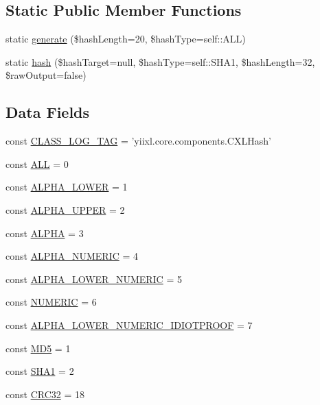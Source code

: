 \subsection*{Static Public Member Functions}
\begin{DoxyCompactItemize}
\item 
static \hyperlink{classCXLHash_a861d68beb0e1d6e79ff85d68212863dd}{generate} (\$hashLength=20, \$hashType=self::ALL)
\item 
static \hyperlink{classCXLHash_ace936368fcb6b1d6d533c4d19cf7e596}{hash} (\$hashTarget=null, \$hashType=self::SHA1, \$hashLength=32, \$rawOutput=false)
\end{DoxyCompactItemize}
\subsection*{Data Fields}
\begin{DoxyCompactItemize}
\item 
const \hyperlink{classCXLHash_aa607ab5e557e6ebb60b85c5a20ad067f}{CLASS\_\-LOG\_\-TAG} = 'yiixl.core.components.CXLHash'
\item 
const \hyperlink{classCXLHash_ab56e734000051e5c12c8c5cf6d8d160d}{ALL} = 0
\item 
const \hyperlink{classCXLHash_a33fc57236d932860ab0ad8e8268e0c99}{ALPHA\_\-LOWER} = 1
\item 
const \hyperlink{classCXLHash_a13afa6f8ce77da9bd4a5af5d473d0d8b}{ALPHA\_\-UPPER} = 2
\item 
const \hyperlink{classCXLHash_a6bb7987358cd3de8e7c775094597e631}{ALPHA} = 3
\item 
const \hyperlink{classCXLHash_a1acce0cfa5c3723599af4c7e325b4312}{ALPHA\_\-NUMERIC} = 4
\item 
const \hyperlink{classCXLHash_a371814049e51cde466af6295bdfed4e3}{ALPHA\_\-LOWER\_\-NUMERIC} = 5
\item 
const \hyperlink{classCXLHash_a19cabff2391d99103d1bf11b0ed2972e}{NUMERIC} = 6
\item 
const \hyperlink{classCXLHash_aa15c0932a4cd96ab710478faace6ccb9}{ALPHA\_\-LOWER\_\-NUMERIC\_\-IDIOTPROOF} = 7
\item 
const \hyperlink{classCXLHash_a66be2064e952a39f04c0a54d83d1c779}{MD5} = 1
\item 
const \hyperlink{classCXLHash_a1ca7a04dcc397e382e3a4ee5e0e1b9a1}{SHA1} = 2
\item 
const \hyperlink{classCXLHash_aeeccfbe476a8ab58ea0c3382287ff0e9}{CRC32} = 18
\end{DoxyCompactItemize}
